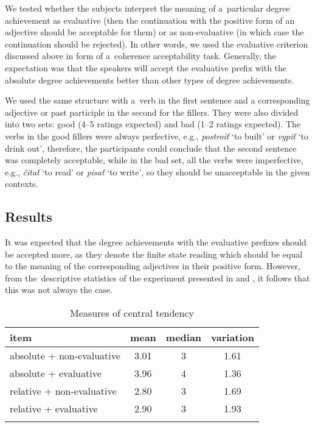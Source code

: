\documentclass[output=paper]{langscibook}
\begin{document}
\noindent We tested whether the subjects interpret the meaning of a~particular degree achievement as evaluative (then the continuation with the positive form of an adjective should be acceptable for them) or as non-evaluative (in which case the continuation should be rejected). In other words, we used the evaluative criterion discussed above in form of a~coherence acceptability task. Generally, the expectation was that the speakers will accept the evaluative prefix with the absolute degree achievements better than other types of degree achievements. 

We used the same structure with a~verb in the first sentence and a corresponding adjective or past participle in the second for the fillers. They were also divided into two sets: good (4--5 ratings expected) and bad (1--2 ratings expected). The verbs in the good fillers were always perfective, e.g., \textit{postroiť} `to built' or \textit{vypiť} `to drink out', therefore, the participants could conclude that the second sentence was completely acceptable, while in the bad set, all the verbs were imperfective, e.g., \textit{čitať} `to read' or \textit{pisať} `to write', so they should be unacceptable in the given contexts. 

\subsection{Results}\label{DA:subsec:results}

It was expected that the degree achievements with the evaluative prefixes should be accepted more, as they denote the finite state reading which should be equal to the meaning of the corresponding adjectives in their positive form. However, from the~descriptive statistics of the experiment presented in  and , it follows that this was not always the case. 

\begin{table}
\caption{Measures of central tendency}
\label{DA:tab:meanmedian}
 \begin{tabular}{l ccc}
  \lsptoprule
  item                       & mean & median & variation \\ 
  \midrule
  absolute + non-evaluative  & 3.01 & 3 & 1.61\\
  absolute + evaluative      & 3.96 & 4 & 1.36\\
  relative + non-evaluative  & 2.80 & 3 & 1.69\\
  relative + evaluative      & 2.90 & 3 & 1.93\\
  \lspbottomrule
 \end{tabular}
\end{table}
\end{document}
